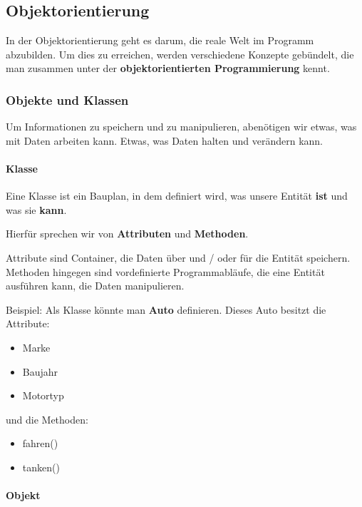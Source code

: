 \subsection{Objektorientierung}
\label{sec:Objektorientierung}

In der Objektorientierung geht es darum, die reale Welt im Programm abzubilden. Um dies zu erreichen, werden verschiedene Konzepte gebündelt, die man zusammen unter der \textbf{objektorientierten Programmierung} kennt.

\subsubsection{Objekte und Klassen}

Um Informationen zu speichern und zu manipulieren, abenötigen wir etwas, was mit Daten arbeiten kann. Etwas, was Daten halten und verändern kann.

\paragraph{Klasse}

Eine Klasse ist ein Bauplan, in dem definiert wird, was unsere Entität \textbf{ist} und was sie \textbf{kann}.

Hierfür sprechen wir von \textbf{Attributen} und \textbf{Methoden}.

Attribute sind Container, die Daten über und / oder für die Entität speichern.
Methoden hingegen sind vordefinierte Programmabläufe, die eine Entität ausführen kann, die Daten manipulieren.

\newpage

\begin{mdframed}
	Beispiel: Als Klasse könnte man \textbf{Auto} definieren. Dieses Auto besitzt die Attribute:
	\begin{itemize}
		\item Marke
		\item Baujahr
		\item Motortyp
	\end{itemize}
	und die Methoden:
	\begin{itemize}
		\item fahren()
		\item tanken()
	\end{itemize}
\end{mdframed}

\paragraph{Objekt}

